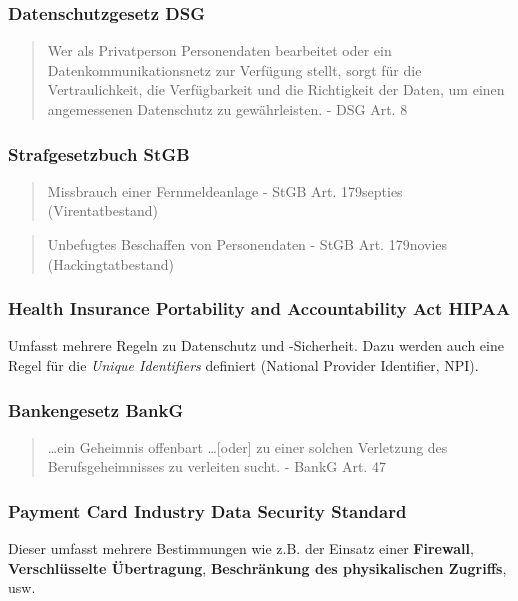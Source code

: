 \subsubsection{Datenschutzgesetz DSG}
\begin{quotation}
	Wer als Privatperson Personendaten bearbeitet oder ein Datenkommunikationsnetz zur Verfügung stellt, sorgt für die Vertraulichkeit, die Verfügbarkeit und die Richtigkeit der Daten, um einen angemessenen Datenschutz zu gewährleisten. - DSG Art. 8
\end{quotation}

\subsubsection{Strafgesetzbuch StGB}
\begin{quotation}
	Missbrauch einer Fernmeldeanlage - StGB Art. 179septies (Virentatbestand)
\end{quotation}

\begin{quotation}
	Unbefugtes Beschaffen von Personendaten - StGB Art. 179novies (Hackingtatbestand)
\end{quotation}

\subsubsection{Health Insurance Portability and Accountability Act HIPAA}
Umfasst mehrere Regeln zu Datenschutz und -Sicherheit. Dazu werden auch eine Regel für die \textit{Unique Identifiers} definiert (National Provider Identifier, NPI).

\subsubsection{Bankengesetz BankG}
\begin{quotation}
	\ldots ein Geheimnis offenbart \ldots [oder] zu einer solchen Verletzung des Berufsgeheimnisses zu verleiten sucht. - BankG Art. 47
\end{quotation}

\subsubsection{Payment Card Industry Data Security Standard}
Dieser umfasst mehrere Bestimmungen wie z.B. der Einsatz einer \textbf{Firewall}, \textbf{Verschlüsselte Übertragung}, \textbf{Beschränkung des physikalischen Zugriffs}, usw.

